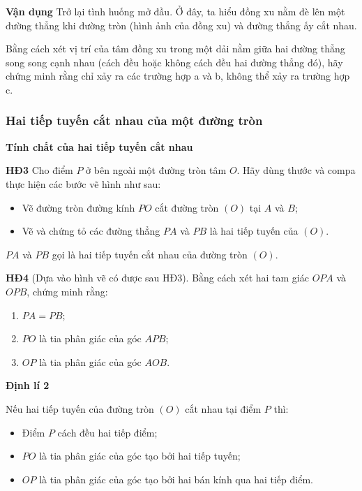 \begin{lesson}
    \textbf{Vận dụng} Trở lại tình huống mở đầu. Ở đây, ta hiểu đồng xu nằm đè lên một đường thẳng khi đường tròn (hình ảnh của đồng xu) và đường thẳng ấy cắt nhau.

    Bằng cách xét vị trí của tâm đồng xu trong một dải nằm giữa hai đường thẳng song song cạnh nhau (cách đều hoặc không cách đều hai đường thẳng đó), hãy chứng minh rằng chỉ xảy ra các trường hợp a và b, không thể xảy ra trường hợp c.

    \answerline
    \answerline
    \answerline

    \subsubsection{Hai tiếp tuyến cắt nhau của một đường tròn}

    \textbf{Tính chất của hai tiếp tuyến cắt nhau}

    \textbf{HĐ3} Cho điểm $P$ ở bên ngoài một đường tròn tâm $O$. Hãy dùng thước và compa thực hiện các bước vẽ hình như sau:
    \begin{itemize}
        \item Vẽ đường tròn đường kính $PO$ cắt đường tròn $(O)$ tại $A$ và $B$;
        \item Vẽ và chứng tỏ các đường thẳng $PA$ và $PB$ là hai tiếp tuyến của $(O)$.
    \end{itemize}

    $PA$ và $PB$ gọi là hai tiếp tuyến cắt nhau của đường tròn $(O)$.

    \answerline
    \answerline

    \textbf{HĐ4} (Dựa vào hình vẽ có được sau HĐ3). Bằng cách xét hai tam giác $OPA$ và $OPB$, chứng minh rằng:
    \begin{enumerate}[label=\alph*)]
        \item $PA=PB$;
        \item $PO$ là tia phân giác của góc $APB$;
        \item $OP$ là tia phân giác của góc $AOB$.
    \end{enumerate}

    \answerline
    \answerline
    \answerline

    \begin{keyconcept}
        \textbf{Định lí 2}

        Nếu hai tiếp tuyến của đường tròn $(O)$ cắt nhau tại điểm $P$ thì:
        \begin{itemize}
            \item Điểm $P$ cách đều hai tiếp điểm;
            \item $PO$ là tia phân giác của góc tạo bởi hai tiếp tuyến;
            \item $OP$ là tia phân giác của góc tạo bởi hai bán kính qua hai tiếp điểm.
        \end{itemize}
    \end{keyconcept}


\end{lesson}
